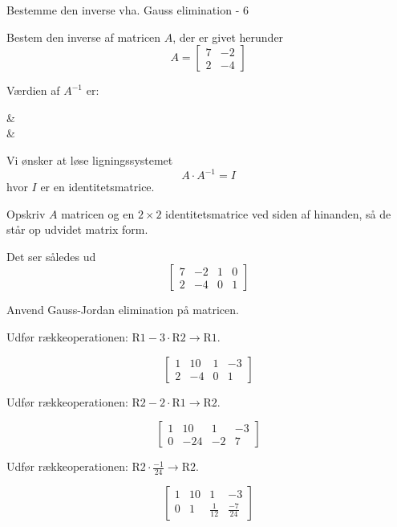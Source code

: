 \documentclass{article}
\begin{document}
\begin{exercise}{Bestemme den inverse vha. Gauss elimination - 6}
	
	Bestem den inverse af matricen $A$, der er givet herunder
	\[
	A = \left[\begin{array}{cc}
	7 & -2 \\ 
	2 & -4
	\end{array} \right]
	\]
	
	Værdien af $A^{-1}$ er:
	\begin{answermatrix}
		 &  \\
		 & 
	\end{answermatrix}
	
	\hint
	Vi ønsker at løse ligningssystemet
	\[
	A \cdot A^{-1} = I
	\]
	hvor $I$ er en identitetsmatrice.
	
	\hint
	Opskriv $A$ matricen og en $2 \times 2$ identitetsmatrice
	ved siden af hinanden, så de står op udvidet matrix form.
	
	\hint
	Det ser således ud
	\[
	\left[\begin{array}{cc|cc}
	7 & -2 & 1 & 0 \\ 
	2 & -4 & 0 & 1
	\end{array} \right]
	\]
	
	\hint
	Anvend Gauss-Jordan elimination på matricen.
	
	\hint
	Udfør rækkeoperationen: $\text{R1} - 3 \cdot  \text{R2} \to \text{R1}$.
	
	\hint
	\[
	\left[\begin{array}{cc|cc}
	1 & 10 & 1 & -3 \\ 
	2 & -4 & 0 & 1
	\end{array} \right]
	\]
	
	\hint
	Udfør rækkeoperationen: $\text{R2} - 2 \cdot \text{R1} \to \text{R2}$.
	
	\hint
	\[
	\left[\begin{array}{cc|cc}
	1 & 10 & 1 & -3 \\ 
	0 & -24 & -2 & 7
	\end{array} \right]
	\]
	
	\hint
	Udfør rækkeoperationen: $\text{R2} \cdot \frac{-1}{24} \to \text{R2}$.
	
	\hint
	\[
	\left[\begin{array}{cc|cc}
	1 & 10 & 1 & -3 \\ 
	0 & 1 & \frac{1}{12} & \frac{-7}{24}
	\end{array} \right]
	\]
	

\end{exercise}
\end{document}
